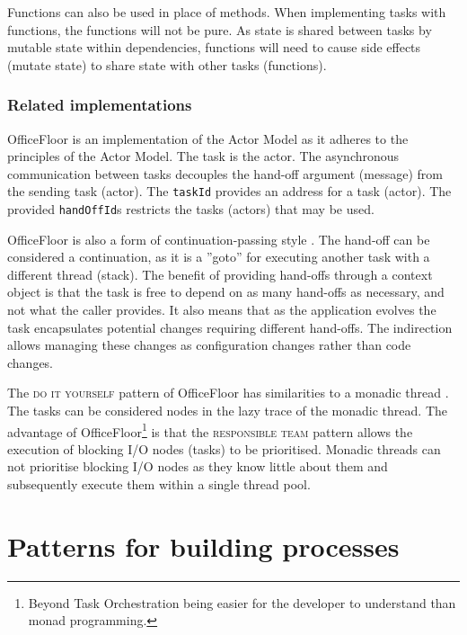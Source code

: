 \documentclass[prodmode]{style/acmlarge}
\begin{document}
Functions can also be used in place of methods.  When implementing tasks with
functions, the functions will not be pure.  As state is shared between tasks by
mutable state within dependencies, functions will need to cause side effects
(mutate state) to share state with other tasks (functions).



\subsubsection*{Related implementations}

OfficeFloor is an implementation of the Actor Model \cite{actors} as it adheres
to the principles of the Actor Model.  The task is the actor.  The asynchronous
communication between tasks decouples the hand-off argument (message) from the
sending task (actor).  The \texttt{taskId} provides an address for a task
(actor).  The provided \texttt{handOffId}s restricts the tasks (actors) that may
be used.

OfficeFloor is also a form of continuation-passing style \cite{continuations}. 
The hand-off can be considered a continuation, as it is a ''goto'' for executing
another task with a different thread (stack).  The benefit of providing
hand-offs through a context object is that the task is free to depend on as many
hand-offs as necessary, and not what the caller provides.  It also means that as
the application evolves the task encapsulates potential changes requiring
different hand-offs.  The indirection allows managing these changes as
configuration changes rather than code changes.

The \textsc{do it yourself} pattern of OfficeFloor has similarities to a monadic
thread \cite{monadic-thread}.  The tasks can be considered nodes in the lazy
trace of the monadic thread.  The advantage of OfficeFloor\footnote{Beyond Task
Orchestration being easier for the developer to understand than monad
programming.} is that the \textsc{responsible team} pattern allows the execution
of blocking I/O nodes (tasks) to be prioritised.  Monadic threads can not
prioritise blocking I/O nodes as they know little about them and subsequently
execute them within a single thread pool.




\section{Patterns for building processes}
\end{document}
